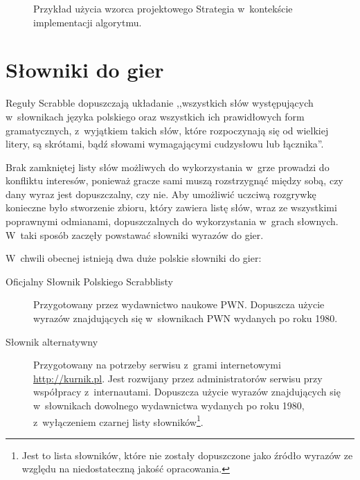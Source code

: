 \documentclass[a4paper,twocolumn,12pt]{article}
\theoremstyle{definition}
\begin{document}
\begin{figure}[ht!]
	\centering
	\caption{Przykład użycia wzorca projektowego Strategia w~kontekście implementacji algorytmu.}
	\label{fig:strategy_pattern}
\end{figure}


\section*{Słowniki do gier}

Reguły Scrabble dopuszczają układanie ,,wszystkich słów występujących w~słownikach języka polskiego oraz wszystkich ich prawidłowych form gramatycznych, z~wyjątkiem takich słów, które rozpoczynają się od wielkiej litery, są skrótami, bądź słowami wymagającymi cudzysłowu lub łącznika''. \cite{scrabble_word_rules} 

Brak zamkniętej listy słów możliwych do wykorzystania w~grze prowadzi do konfliktu interesów, ponieważ gracze sami muszą rozstrzygnąć między sobą, czy dany wyraz jest dopuszczalny, czy nie. Aby umożliwić uczciwą rozgrywkę konieczne było stworzenie zbioru, który zawiera listę słów, wraz ze wszystkimi poprawnymi odmianami, dopuszczalnych do wykorzystania w~grach słownych. W~taki sposób zaczęły powstawać słowniki wyrazów do gier. \cite{game_dictionary_definition}

W~chwili obecnej istnieją dwa duże polskie słowniki do gier:

\begin{description}
 \item [Oficjalny Słownik Polskiego Scrabblisty] Przygotowany przez wydawnictwo naukowe PWN. Dopuszcza użycie wyrazów znajdujących się w~słownikach PWN wydanych po roku 1980.
 \item[Słownik alternatywny] Przygotowany na potrzeby serwisu z~grami internetowymi \url{http://kurnik.pl}. Jest rozwijany przez administratorów serwisu przy współpracy z~internautami. Dopuszcza użycie wyrazów znajdujących się w~słownikach dowolnego wydawnictwa wydanych po roku 1980, z~wyłączeniem czarnej listy słowników\footnote{Jest to lista słowników, które nie zostały dopuszczone jako źródło wyrazów ze względu na niedostateczną jakość opracowania.}. 
\end{description}
\end{document}
